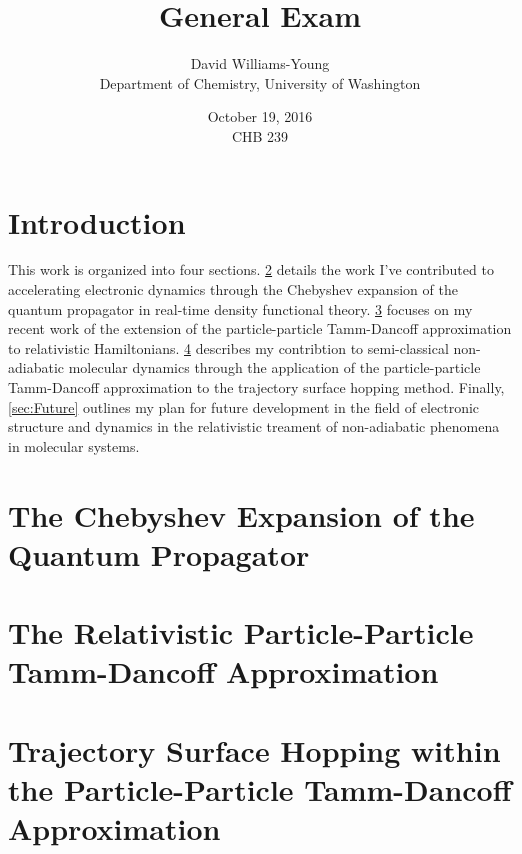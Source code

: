 \documentclass[12pt]{article}
\title{General Exam}
\date{October 19, 2016 \\ CHB 239}
\author{David Williams-Young\\ Department of Chemistry, University of Washington}
\begin{document}
\maketitle


\newpage
\section{Introduction}

This work is organized into four sections.
\cref{sec:Chebyshev} details the work I've contributed to accelerating 
electronic dynamics through the Chebyshev expansion of the quantum propagator 
in real-time density functional theory.
\cref{sec:pp-X2C} focuses on my recent work of the extension of the
particle-particle Tamm-Dancoff approximation to relativistic Hamiltonians.
\cref{sec:pp-TSH} describes my contribtion to semi-classical non-adiabatic 
molecular dynamics through the application of the particle-particle Tamm-Dancoff
approximation to the trajectory surface hopping method.
Finally, \cref{sec:Future} outlines my plan for future development in the field
of electronic structure and dynamics in the relativistic treament of non-adiabatic
phenomena in molecular systems.

\section{The Chebyshev Expansion of the Quantum Propagator}
\label{sec:Chebyshev}
\section{The Relativistic Particle-Particle Tamm-Dancoff Approximation}
\label{sec:pp-X2C}


\section{Trajectory Surface Hopping within the Particle-Particle Tamm-Dancoff Approximation}
\label{sec:pp-TSH}
\end{document}
